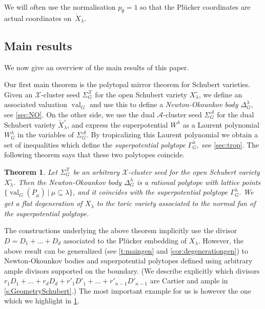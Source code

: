 \documentclass{amsart}
\newtheorem{mainthm}{Theorem}
\theoremstyle{definition}
\numberwithin{equation}{section}
\newcommand{\val}{{\operatorname{val}}}
\newcommand{\dualSchub}{\check{X}_{\lambda}}
\begin{document}
We will often use the normalisation $p_{\emptyset}=1$ so that the Pl\"ucker coordinates are
 actual coordinates on~$\dualSchub$.



\subsection{Main results}
We now give an overview of the main results of this paper.


Our first main theorem is the polytopal mirror theorem for Schubert varieties.
Given an
$\mathcal{X}$-cluster seed 
 $\Sigma_G^{\mathcal{X}}$ for
the open Schubert variety $X^{\circ}_{\lambda}$, we define 
an associated valuation $\val_G$ and use this to define a \emph{Newton-Okounkov body} 
$\Delta_G^{\lambda}$, see \cref{sec:NO}.
On the other side, we use the dual $\mathcal{A}$-cluster seed
 $\Sigma_G^{\mathcal{A}}$ for
the dual Schubert variety ${\check X}^{\circ}_{\lambda}$, and express the superpotential
$W^{\lambda}$ as a Laurent polynomial $W^{\lambda}_G$ in the variables of 
 $\Sigma_G^{\mathcal{A}}$.  By tropicalizing this Laurent polynomial we obtain 
 a set of inequalities which define the \emph{superpotential polytope}
$\Gamma^{\lambda}_{G},$ see \cref{sec:trop}.
The following theorem says that these two polytopes coincide.

\begin{mainthm}\label{t:mainIntro}
Let $\Sigma_G^{\mathcal{X}}$ be an arbitrary
$\mathcal{X}$-cluster seed for 
the open Schubert variety $X^{\circ}_{\lambda}$.
Then
 the Newton-Okounkov body
$\Delta^{\lambda}_{G}$
is a rational polytope
with lattice points
$\{\val_G(P_{\mu}) \ \vert \  \mu \subseteq \lambda\}$,
       and it coincides with
the superpotential polytope
$\Gamma^{\lambda}_{G}.$
We get a flat degeneration of $X_{\lambda}$ to the toric variety associated to the normal fan of the superpotential polytope.
\end{mainthm}
The constructions underlying the above theorem  implicitly use the divisor 
$D=D_1 + \dots + D_d$ associated to the Pl\"ucker embedding of $X_\lambda$. 
However, the above result can be generalized (see
\cref{t:maingen} and \cref{cor:degenerationgen}) to 
Newton-Okounkov bodies and superpotential polytopes
defined using arbitrary ample  divisors supported on the boundary.  (We 
 describe explicitly which divisors $r_1D_1+\dotsc+ r_{d} D_{d}+ r'_{1} D'_{1}+\dotsc + r'_{n-1} D'_{n-1}$ are Cartier and ample in \cref{s:GeometrySchubert}.) 
The most important example for us is however the one which we highlight in 
\cref{t:mainIntro}.
\end{document}
